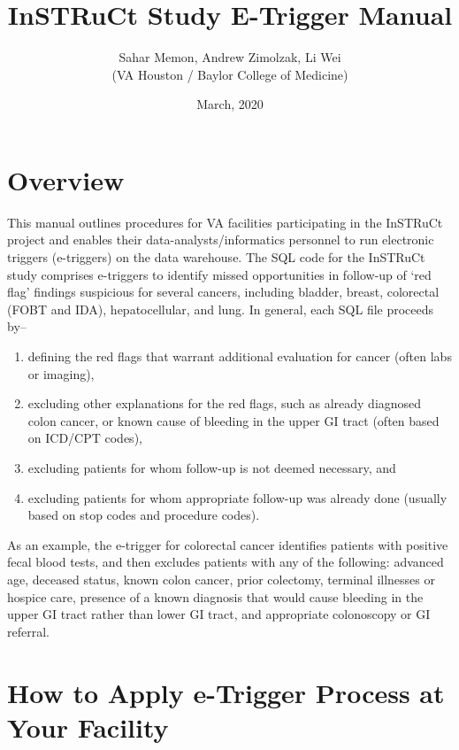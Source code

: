 \documentclass{article}
\author{Sahar Memon, Andrew Zimolzak, Li Wei\\(VA Houston / Baylor
  College of Medicine)}
\title{InSTRuCt Study E-Trigger Manual}
\date{March, 2020}
\begin{document}
\maketitle

\section{Overview}

This manual outlines procedures for VA facilities participating in the
InSTRuCt project and enables their data-analysts/informatics personnel
to run electronic triggers (e-triggers) on the data warehouse. The SQL
code for the InSTRuCt study comprises e-triggers to identify missed
opportunities in follow-up of `red flag' findings suspicious for
several cancers, including bladder, breast, colorectal (FOBT and IDA),
hepatocellular, and lung. In general, each SQL file proceeds by--

\begin{enumerate}
\item defining the red flags that warrant additional evaluation for
  cancer (often labs or imaging),

\item excluding other explanations for the red flags, such as already
  diagnosed colon cancer, or known cause of bleeding in the upper GI
  tract (often based on ICD/CPT codes),

\item excluding patients for whom follow-up is not deemed necessary,
  and

\item excluding patients for whom appropriate follow-up was already
  done (usually based on stop codes and procedure codes).
\end{enumerate}

As an example, the e-trigger for colorectal cancer identifies patients
with positive fecal blood tests, and then excludes patients with any
of the following: advanced age, deceased status, known colon cancer,
prior colectomy, terminal illnesses or hospice care, presence of a
known diagnosis that would cause bleeding in the upper GI tract rather
than lower GI tract, and appropriate colonoscopy or GI referral.

\section{How to Apply e-Trigger Process at Your Facility}
\end{document}
